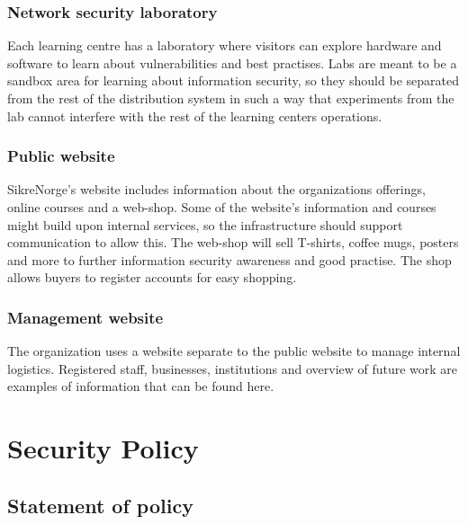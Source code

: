 \subsubsection{Network security laboratory}

Each learning centre has a laboratory where visitors can explore hardware and software to learn about vulnerabilities and best practises. Labs are meant to be a sandbox area for learning about information security, so they should be separated from the rest of the distribution system in such a way that experiments from the lab cannot interfere with the rest of the learning centers operations.


\subsubsection{Public website}

SikreNorge's website includes information about the organizations offerings, online courses and a web-shop. Some of the website's information and courses might build upon internal services, so the infrastructure should support communication to allow this. The web-shop will sell T-shirts, coffee mugs, posters and more to further information security awareness and good practise. The shop allows buyers to register accounts for easy shopping.

\subsubsection{Management website}

The organization uses a website separate to the public website to manage internal logistics. Registered staff, businesses, institutions and overview of future work are examples of information that can be found here.


\section{Security Policy}


\subsection{Statement of policy}

